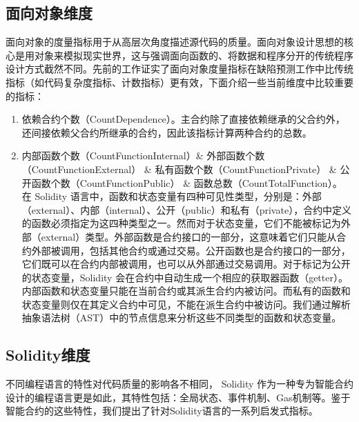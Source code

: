 \subsection{面向对象维度}
\label{sec:面向对象维度}
面向对象的度量指标用于从高层次角度描述源代码的质量。面向对象设计思想的核心是用对象来模拟现实世界，这与强调面向函数的、将数据和程序分开的传统程序设计方式截然不同。先前的工作\cite{martin1994oodesign,basili1996validation,KHAN20071}证实了面向对象度量指标在缺陷预测工作中比传统指标（如代码复杂度指标、计数指标）更有效，下面介绍一些当前维度中比较重要的指标：
\begin{enumerate}[label=(\arabic*)]

    \item 依赖合约个数（CountDependence）。主合约除了直接依赖继承的父合约外，还间接依赖父合约所继承的合约，因此该指标计算两种合约的总数。


    \item 内部函数个数（CountFunctionInternal）\& 外部函数个数（CountFunctionExternal） \& 私有函数个数（CountFunctionPrivate） \& 公开函数个数（CountFunctionPublic） \& 函数总数（CountTotalFunction）。
    在 Solidity 语言中，函数和状态变量有四种可见性类型，分别是：外部（external）、内部（internal）、公开（public）和私有（private），合约中定义的函数必须指定为这四种类型之一。然而对于状态变量，它们不能被标记为外部（external）类型。外部函数是合约接口的一部分，这意味着它们只能从合约外部被调用，包括其他合约或通过交易。公开函数也是合约接口的一部分，它们既可以在合约内部被调用，也可以从外部通过交易调用。对于标记为公开的状态变量，Solidity 会在合约中自动生成一个相应的获取器函数（getter）。内部函数和状态变量只能在当前合约或其派生合约内被访问。而私有的函数和状态变量则仅在其定义合约中可见，不能在派生合约中被访问。我们通过解析抽象语法树（AST）中的节点信息来分析这些不同类型的函数和状态变量。
\end{enumerate}
\subsection{Solidity维度}
\label{sec:Solidity维度}
不同编程语言的特性对代码质量的影响各不相同， Solidity 作为一种专为智能合约设计的编程语言更是如此，其特性包括：全局状态、事件机制、Gas机制等。鉴于智能合约的这些特性，我们提出了针对Solidity语言的一系列启发式指标。


